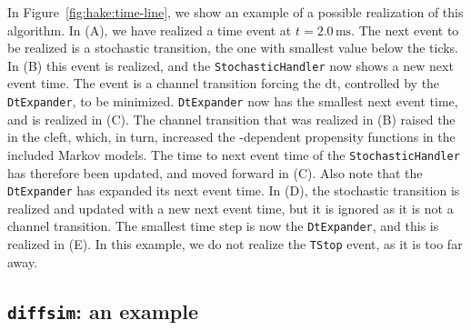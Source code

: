 In Figure~\ref{fig:hake:time-line}, we show an example of a possible
realization of this algorithm. In (A), we have realized a
time event at $t=2.0\,\mathrm{ms}$. The next event to be realized is a
stochastic transition, the one with smallest value below the ticks. In
(B) this event is realized, and the \texttt{StochasticHandler}
now shows a new next event time. The event is a channel transition
forcing the dt, controlled by the \texttt{DtExpander}, to be
minimized. \texttt{DtExpander} now has the smallest next event time,
and is realized in (C). The channel transition that was
realized in (B) raised the \CaC in the cleft, which, in turn,
increased the \Ca-dependent propensity functions in the included
Markov models. The time to next event time of the
\texttt{StochasticHandler} has therefore been updated, and moved
forward in (C). Also note that the \texttt{DtExpander} has
expanded its next event time. In (D), the stochastic transition
is realized and updated with a new next event time, but it is ignored
as it is not a channel transition. The smallest time step is now the
\texttt{DtExpander}, and this is realized in (E). In this
example, we do not realize the \texttt{TStop} event, as it is too far
away.
\subsection{\texttt{diffsim}: an example}
 

